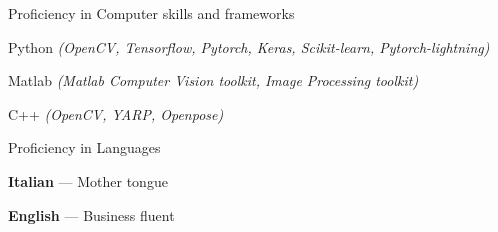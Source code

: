 


\begin{cventries}

 
  \cventry
    {Proficiency in} %
    {Computer skills and frameworks} %
    {} %
    {} %
    {
      \begin{cvitems} %
	\item Python \textit{(OpenCV, Tensorflow, Pytorch, Keras, Scikit-learn, Pytorch-lightning)}
	\item Matlab \textit{(Matlab Computer Vision toolkit, Image Processing toolkit)}
	\item C++ \textit{(OpenCV, YARP, Openpose)}
	\end{cvitems}
	}
	
  \cventry
    {Proficiency in} %
    {Languages} %
    {} %
    {} %
    {
      \begin{cvitems} %
	\item \textbf{Italian} --- {Mother tongue}
	\item \textbf{English} --- {Business fluent}
	\end{cvitems}
	}
	
	

\end{cventries}
